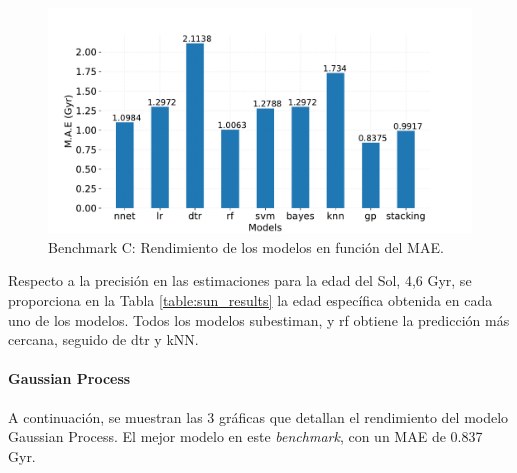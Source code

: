 \begin{figure}[H]
\begin{center}
 \includegraphics[width=0.8\linewidth]{Figuras/Experimentos/B_C_models.pdf}
\end{center}
\caption{Benchmark C: Rendimiento de los modelos en función del MAE.}
 \label{fig:benchC}
\end{figure}

Respecto a la precisión en las estimaciones para la edad del Sol, 4,6 Gyr, se proporciona en la Tabla \ref{table:sun_results} la edad específica obtenida en cada uno de los modelos. Todos los modelos subestiman, y rf obtiene la predicción más cercana, seguido de dtr y kNN.


\begin{table}[H]
\centering
{}%
\caption{Edad estimada para el Sol en Gyr. El método más preciso es rf. }\label{table:sun_results}
\end{table}
\paragraph{Gaussian Process} 
A continuación, se muestran las 3 gráficas que detallan el rendimiento del modelo Gaussian Process. El mejor modelo en este \emph{benchmark}, con un MAE de 0.837 Gyr.

